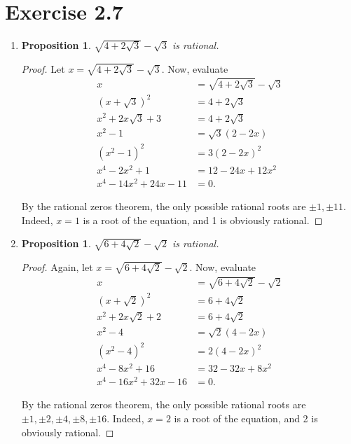 \documentclass{article}
\newtheorem{proposition}[thm]{Proposition}
\begin{document}
\section*{Exercise 2.7}
\begin{enumerate}[label=(\alph*)]
    \item \begin{proposition}
        $\sqrt{4+2\sqrt{3}} - \sqrt{3}$ is rational.
    \end{proposition}

    \begin{proof}
        Let $x = \sqrt{4+2\sqrt{3}} - \sqrt{3}$. Now, evaluate
        \begin{align*}
            x & = \sqrt{4+2\sqrt{3}} - \sqrt{3} \\
            (x + \sqrt{3})^2 & = 4 + 2\sqrt{3} \\
            x^2 + 2x\sqrt{3} + 3 & = 4 + 2\sqrt{3} \\
            x^2 - 1 & = \sqrt{3}(2-2x) \\
            (x^2 - 1)^2 & = 3(2-2x)^2 \\
            x^4 - 2x^2 + 1 & = 12 - 24x + 12x^2 \\
            x^4 - 14x^2 + 24x - 11 & = 0.
        \end{align*}

        By the rational zeros theorem, the only possible rational roots are $\pm 1, \pm 11$. Indeed, 
        $x = 1$ is a root of the equation, and 1 is obviously rational.
    \end{proof}

    \item \begin{proposition}
        $\sqrt{6 + 4\sqrt{2}} - \sqrt{2}$ is rational.
    \end{proposition}

    \begin{proof}
        Again, let $x = \sqrt{6 + 4\sqrt{2}} - \sqrt{2}$. Now, evaluate
        \begin{align*}
            x & = \sqrt{6 + 4\sqrt{2}} - \sqrt{2} \\
            (x + \sqrt{2})^2 & = 6 + 4\sqrt{2} \\
            x^2 + 2x\sqrt{2} + 2 & = 6 + 4\sqrt{2} \\
            x^2 - 4 & = \sqrt{2}(4-2x) \\
            (x^2 - 4)^2 & = 2(4-2x)^2 \\
            x^4 - 8x^2 + 16 & = 32 - 32x + 8x^2 \\
            x^4 - 16x^2 + 32x - 16 & = 0.
        \end{align*}

        By the rational zeros theorem, the only possible rational roots are $\pm 1, \pm 2, \pm 4,
        \pm 8, \pm 16$. Indeed, $x = 2$ is a root of the equation, and 2 is obviously rational.
    \end{proof}
\end{enumerate}
\end{document}
